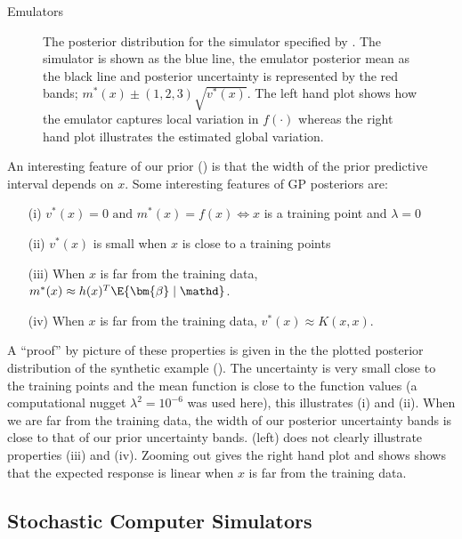 \begin{chapter}{Emulators \label{Ch:Emulators}}
\begin{figure}[h]
  \caption{The posterior distribution for the simulator specified by . The simulator is shown as the blue line, the emulator posterior mean as the black line and posterior uncertainty is represented by the red bands; $m^{*} (x) \pm (1,2,3)\sqrt{ v^{*}(x) } $. The left hand plot shows how the emulator captures local variation in $f(\cdot)$ whereas the right hand plot illustrates the estimated global variation.}
  \label{Fig:posterior}
\end{figure}

An interesting feature of our prior () is that the width of the prior predictive interval depends on $x$. Some interesting features of GP posteriors are:
\begin{itemize}
  \item[(i)] $v^* (x) = 0 \text{ and } m^*(x) = f(x) \iff x$ is a training point and $\lambda = 0$
  \item[(ii)] $v^* (x)$ is small when $x$ is close to a training points
  \item[(iii)]  When $x$ is far from the training data, $m^*(x) \approx h(x)^T \E \{ \bm{\beta} \mid \mathd \} $.
  \item[(iv)] When $x$ is far from the training data, $v^*(x) \approx K(x,x)$.
\end{itemize}
A ``proof'' by picture of these properties is given in the the plotted posterior distribution of the synthetic example (). The uncertainty is very small close to the training points and the mean function is close to the function values (a computational nugget $\lambda^2 = 10^{-6}$ was used here), this illustrates (i) and (ii). When we are far from the training data, the width of our posterior uncertainty bands is close to that of our prior uncertainty bands.  (left) does not clearly illustrate properties (iii) and (iv). Zooming out gives the right hand plot and shows shows that the expected response is linear when $x$ is far from the training data.

\subsection{Stochastic Computer Simulators}


\end{chapter}
